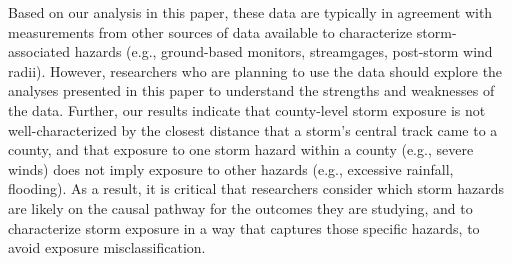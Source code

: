 Based on our analysis in this paper, these data are typically in agreement with
measurements from other sources of data available to characterize
storm-associated hazards (e.g., ground-based monitors, streamgages, post-storm
wind radii).  However, researchers who are planning to use the data
should explore the analyses presented in this paper to understand the strengths
and weaknesses of the data.  Further, our results indicate that county-level storm
exposure is not well-characterized by the closest distance that a storm's
central track came to a county, and that exposure to one storm hazard within a
county (e.g., severe winds) does not imply exposure to other hazards (e.g.,
excessive rainfall, flooding). As a result, it is critical that researchers
consider which storm hazards are likely on the causal pathway for the outcomes
they are studying, and to characterize storm exposure in a way that captures
those specific hazards, to avoid exposure misclassification. 
